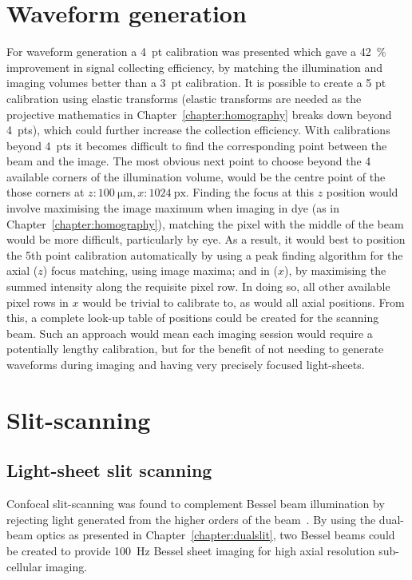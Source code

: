 \section{Waveform generation}

For waveform generation a 4~pt calibration was presented which gave a \SI{42}{\percent} improvement in signal collecting efficiency, by matching the illumination and imaging volumes better than a 3~pt calibration.
It is possible to create a 5 pt calibration using elastic transforms (elastic transforms are needed as the projective mathematics in Chapter~\ref{chapter:homography} breaks down beyond 4~pts), which could further increase the collection efficiency.
With calibrations beyond 4~pts it becomes difficult to find the corresponding point between the beam and the image.
The most obvious next point to choose beyond the 4 available corners of the illumination volume, would be the centre point of the those corners at \(z:\SI{100}{\micro\meter},x:\SI{1024}{\text{px}}\).
Finding the focus at this \(z\) position would involve maximising the image maximum when imaging in dye (as in Chapter~\ref{chapter:homography}), matching the  pixel with the middle of the beam would be more difficult, particularly by eye.
As a result, it would best to position the 5th point calibration automatically by using a peak finding algorithm for the axial (\(z\)) focus matching, using image maxima; and in (\(x\)), by maximising the summed intensity along the requisite pixel row.
In doing so, all other available pixel rows in \(x\) would be trivial to calibrate to, as would all axial positions.
From this, a complete look-up table of positions could be created for the scanning beam.
Such an approach would mean each imaging session would require a potentially lengthy calibration, but for the benefit of not needing to generate waveforms during imaging and having very precisely focused light-sheets.

\section{Slit-scanning}

\subsection{Light-sheet slit scanning}

Confocal slit-scanning was found to complement Bessel beam illumination by rejecting light generated from the higher orders of the beam~\cite{fahrbach_rapid_2013}.
By using the dual-beam optics as presented in Chapter~\ref{chapter:dualslit}, two Bessel beams could be created to provide \SI{100}{\hertz} Bessel sheet imaging for high axial resolution sub-cellular imaging.

